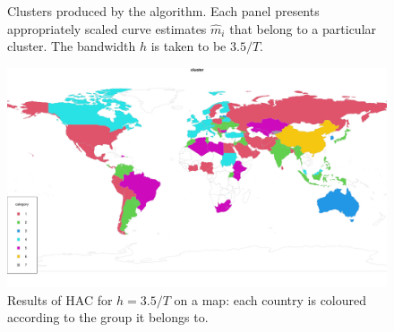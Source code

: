 \documentclass[a4paper,12pt]{article}
\numberwithin{equation}{section}
\begin{document}
\begin{figure}
\ContinuedFloat
\centering
\begin{subfigure}[b]{0.48\textwidth}
\end{subfigure}
\caption{Clusters produced by the algorithm. Each panel presents appropriately scaled curve estimates $\hat{m}_i$ that belong to a particular cluster. The bandwidth $h$ is taken to be $3.5/T$.}\label{fig:clusters}
\end{figure}

\begin{figure}[t!]
\begin{minipage}[t]{0.98\textwidth}
\includegraphics[width=\textwidth]{plots/7days/choropleth}
\caption{Results of HAC for $h = 3.5/T$ on a map: each country is coloured according to the group it belongs to.}\label{fig:map}
\end{minipage}
\end{figure}
\end{document}

